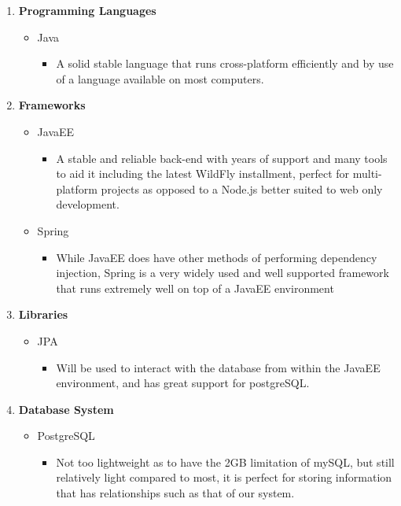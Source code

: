 \documentclass{article}
\begin{document}
				\begin{enumerate}
				\item \textbf{Programming Languages}
				\begin{itemize}
					\item Java
						\begin{itemize}
							\item A solid stable language that runs cross-platform efficiently and by use of a language available on most computers.
						\end{itemize}
				\end{itemize}
				\item \textbf{Frameworks}
				\begin{itemize}
					\item JavaEE
					\begin{itemize}
						\item A stable and reliable back-end with years of support and many tools to aid it including the latest WildFly installment, perfect for multi-platform projects as opposed to a Node.js better suited to web only development.
					\end{itemize}
					\item Spring
					\begin{itemize}
						\item While JavaEE does have other methods of performing dependency injection, Spring is a very widely used and well supported framework that runs extremely well on top of a JavaEE environment 
					\end{itemize}
				\end{itemize}
				\item \textbf{Libraries}
				\begin{itemize}
					\item JPA
					\begin{itemize}
						\item Will be used to interact with the database from within the JavaEE environment, and has great support for postgreSQL.
					\end{itemize}
				\end{itemize}
				\item \textbf{Database System}
				\begin{itemize}
					\item PostgreSQL
					\begin{itemize}
						\item Not too lightweight as to have the 2GB limitation of mySQL, but still relatively light compared to most, it is perfect for storing information that has relationships such as that of our system.

\end{itemize}
\end{itemize}
\end{enumerate}
\end{document}
